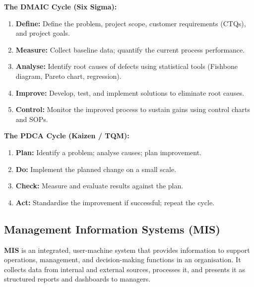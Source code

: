 \documentclass[12pt,a4paper]{article}
\begin{document}
\textbf{The DMAIC Cycle (Six Sigma):}
\begin{enumerate}[label=\textbf{\arabic*.}, leftmargin=*, itemsep=2pt, topsep=2pt]
  \item \textbf{Define:} Define the problem, project scope, customer requirements (CTQs), and project goals.
  \item \textbf{Measure:} Collect baseline data; quantify the current process performance.
  \item \textbf{Analyse:} Identify root causes of defects using statistical tools (Fishbone diagram, Pareto chart, regression).
  \item \textbf{Improve:} Develop, test, and implement solutions to eliminate root causes.
  \item \textbf{Control:} Monitor the improved process to sustain gains using control charts and SOPs.
\end{enumerate}

\textbf{The PDCA Cycle (Kaizen / TQM):}
\begin{enumerate}[label=\textbf{\arabic*.}, leftmargin=*, itemsep=2pt, topsep=2pt]
  \item \textbf{Plan:} Identify a problem; analyse causes; plan improvement.
  \item \textbf{Do:} Implement the planned change on a small scale.
  \item \textbf{Check:} Measure and evaluate results against the plan.
  \item \textbf{Act:} Standardise the improvement if successful; repeat the cycle.
\end{enumerate}

\subsection{Management Information Systems (MIS)}

\begin{tcolorbox}[defbox, title={\textbf{Management Information System (MIS)}}]
\textbf{MIS} is an integrated, user-machine system that provides information to support operations, management, and decision-making functions in an organisation. It collects data from internal and external sources, processes it, and presents it as structured reports and dashboards to managers.
\end{tcolorbox}
\end{document}
